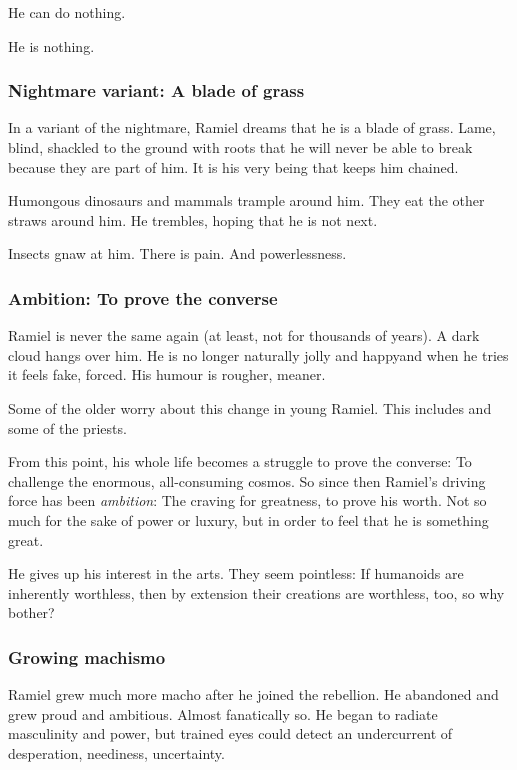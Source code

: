 He can do nothing. 

He is nothing. 




\subsubsection{Nightmare variant: A blade of grass}
In a variant of the  nightmare, Ramiel dreams that he is a blade of grass. 
Lame, blind, shackled to the ground with roots that he will never be able to break because they are part of him. 
It is his very being that keeps him chained. 

Humongous dinosaurs and mammals trample around him. 
They eat the other straws around him. 
He trembles, hoping that he is not next. 

Insects gnaw at him. 
There is pain. 
And powerlessness. 






\subsubsection{Ambition: To prove the converse}
Ramiel is never the same again (at least, not for thousands of years). 
A dark cloud hangs over him. 
He is no longer naturally jolly and happy\dash and when he tries it feels fake, forced. 
His humour is rougher, meaner. 

Some of the older \resphain{} worry about this change in young Ramiel. 
This includes \Sithiyacaan{} and some of the priests. 

From this point, his whole life becomes a struggle to prove the converse: 
To challenge the enormous, all-consuming cosmos. 
So since then Ramiel's driving force has been \emph{ambition}: 
The craving for greatness, to prove his worth. 
Not so much for the sake of power or luxury, but in order to feel that he is something great. 

He gives up his interest in the arts. 
They seem pointless: 
If humanoids are inherently worthless, then by extension their creations are worthless, too, so why bother? 





\subsubsection{Growing machismo}
Ramiel grew much more macho after he joined the rebellion. 
He abandoned  and grew proud and ambitious. 
Almost fanatically so. 
He began to radiate masculinity and power, but trained eyes could detect an undercurrent of desperation, neediness, uncertainty. 





